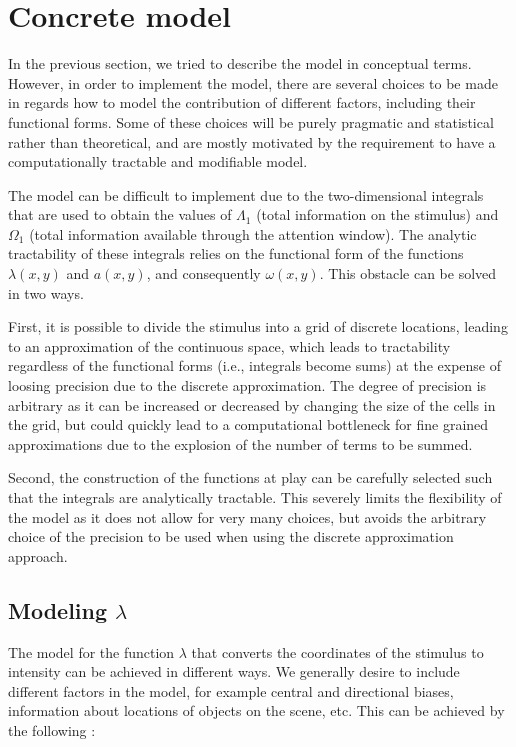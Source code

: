 \documentclass{article}
\begin{document}
\section{Concrete model}

In the previous section, we tried to describe the model in conceptual terms. However, in order to implement the model, there are several choices to be made in regards how to model the contribution of different factors, including their functional forms. Some of these choices will be purely pragmatic and statistical rather than theoretical, and are mostly motivated by the requirement to have a computationally tractable and modifiable model.

The model can be difficult to implement due to the two-dimensional integrals that are used to obtain the values of $\Lambda_1$ (total information on the stimulus) and $\Omega_1$ (total information available through the attention window). The analytic tractability of these integrals relies on the functional form of the functions $\lambda(x, y)$ and $a(x, y)$, and consequently $\omega(x, y)$. This obstacle can be solved in two ways. 

First, it is possible to divide the stimulus into a grid of discrete locations, leading to an approximation of the continuous space, which leads to tractability regardless of the functional forms (i.e., integrals become sums) at the expense of loosing precision due to the discrete approximation. The degree of precision is arbitrary as it can be increased or decreased by changing the size of the cells in the grid, but could quickly lead to a computational bottleneck for fine grained approximations due to the explosion of the number of terms to be summed.

Second, the construction of the functions at play can be carefully selected such that the integrals are analytically tractable. This severely limits the flexibility of the model as it does not allow for very many choices, but avoids the arbitrary choice of the precision to be used when using the discrete approximation approach.


\subsection{Modeling $\lambda$}

The model for the function $\lambda$ that converts the coordinates of the stimulus to intensity can be achieved in different ways. We generally desire to include different factors in the model, for example central and directional biases, information about locations of objects on the scene, etc. This can be achieved by the following \citep{barthelme2013spatial}:
\end{document}
